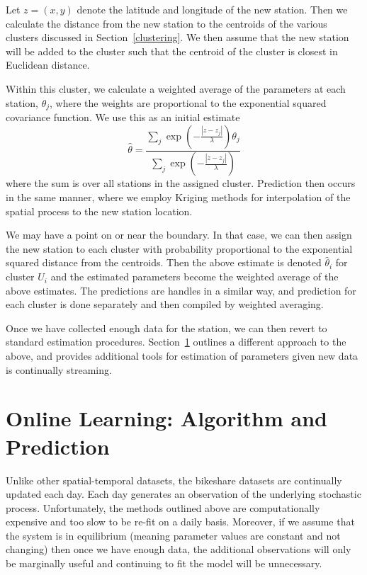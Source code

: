 \documentclass{acm_proc_article-sp}
\begin{document}
Let $z=(x,y)$ denote the latitude and longitude of the new station.  Then we calculate the distance from the new station to the centroids of the various clusters discussed in Section~\ref{clustering}.  We then assume that the new station will be added to the cluster such that the centroid of the cluster is closest in Euclidean distance.

Within this cluster, we calculate a weighted average of the parameters at each station, $\theta_j$, where the weights are proportional to the exponential squared covariance function.  We use this as an initial estimate 
\begin{equation}
\hat{\theta} = \frac{\sum_j \exp \left( - \frac{ |z - z_j|}{\lambda} \right) \theta_j}{\sum_j \exp \left( - \frac{ |z - z_j|}{\lambda} \right) }
\end{equation}
\noindent where the sum is over all stations in the assigned cluster.  Prediction then occurs in the same manner, where we employ Kriging methods for interpolation of the spatial process to the new station location.

We may have a point on or near the boundary.  In that case, we can then assign the new station to each cluster with probability proportional to the exponential squared distance from the centroids.  Then the above estimate is denoted $\hat{\theta}_i$ for cluster $U_i$ and the estimated parameters become the weighted average of the above estimates.  The predictions are handles in a similar way, and prediction for each cluster is done separately and then compiled by weighted averaging.

Once we have collected enough data for the station, we can then revert to standard estimation procedures.  Section~\ref{online_learning}  outlines a different approach to the above, and provides additional tools for estimation of parameters given new data is continually streaming.

\section{Online Learning: Algorithm and Prediction} \label{online_learning}

Unlike other spatial-temporal datasets, the bikeshare datasets are continually updated each day.  Each day generates an observation of the underlying stochastic process. Unfortunately, the methods outlined above are computationally expensive and too slow to be re-fit on a daily basis.  Moreover, if we assume that the system is in equilibrium (meaning parameter values are constant and not changing) then once we have enough data, the additional observations will only be marginally useful and continuing to fit the model will be unnecessary.
\end{document}
